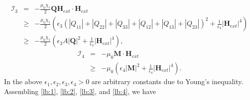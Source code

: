 \documentclass{article}
\def\Qvec{\mathbf{Q}}
\def \Mvec{\mathbf{M}}
\def\Hvec{\mathbf{H}}
\begin{document}
\begin{eqnarray}
\mathcal{I}_3&=&  - \frac{\mu_0\chi_1}{2}\Qvec\Hvec_{ext}\cdot\Hvec_{ext}\nonumber\\
&\ge&  - \frac{\mu_0\chi_1}{2}\left(\epsilon_3\left(|Q_{11}|+|Q_{22}|+|Q_{33}|+|Q_{12}|+|Q_{13}|+|Q_{23}|\right)^2+\frac{1}{\epsilon_3}|\Hvec_{ext}|^4\right)\nonumber\\
&\ge&  - \frac{\mu_0\chi_1}{2}\left(\epsilon_3A|\Qvec|^2+\frac{1}{\epsilon_3}|\Hvec_{ext}|^4\right),\label{lb:3}
\end{eqnarray}
\begin{eqnarray}
\mathcal{I}_4&=& -\mu_0\Mvec\cdot\Hvec_{ext}\nonumber\\
&\ge&-\mu_0\left(\epsilon_4|\Mvec|^2+\frac{1}{\epsilon_4}|\Hvec_{ext}|^4\right).\label{lb:4}
\end{eqnarray}
In the above $\epsilon_1, \epsilon_2, \epsilon_3, \epsilon_4>0$ are arbitrary constants due to Young's inequality.\newline\\
Assembling \eqref{lb:1}, \eqref{lb:2}, \eqref{lb:3}, and \eqref{lb:4}, we have
\end{document}
